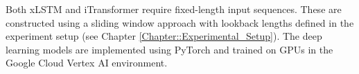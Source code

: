 \documentclass[class=scrbook, crop=false]{standalone}
\begin{document}
Both xLSTM and iTransformer require fixed-length input sequences. These are constructed using a sliding window approach with lookback lengths defined in the experiment setup (see Chapter \ref{Chapter::Experimental_Setup}). The deep learning models are implemented using PyTorch and trained on GPUs in the Google Cloud Vertex AI environment.


%






\end{document}
